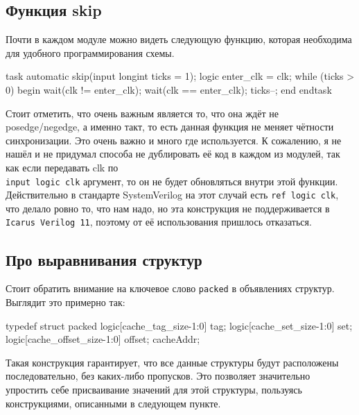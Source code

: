 \documentclass[14pt, russian, onesize]{extreport}
\begin{document}
\subsection*{ Функция skip }
Почти в каждом модуле можно видеть следующую функцию, которая
необходима для удобного программирования схемы.
\begin{svcode}
    task automatic skip(input longint ticks = 1);
        logic enter_clk = clk;
        while (ticks > 0) begin
            wait(clk != enter_clk);
            wait(clk == enter_clk);
            ticks--;
        end
    endtask
\end{svcode}
Стоит отметить, что очень важным является то, что она
ждёт не posedge\slash negedge, а именно такт, то есть
данная функция не меняет чётности синхронизации. Это
очень важно и много где используется.
К сожалению, я не нашёл и не придумал способа не дублировать
её код в каждом из модулей, так как если передавать clk по\\
\texttt{input logic clk} аргумент, то он не будет
обновляться внутри этой функции. Действительно в стандарте
SystemVerilog на этот случай есть \texttt{ref logic clk},
что делало ровно то, что нам надо, но эта конструкция не 
поддерживается в \texttt{Icarus Verilog 11}, поэтому от
её использования пришлось отказаться. 

\subsection*{ Про выравнивания структур }
Стоит обратить внимание на ключевое слово \texttt{packed} 
в объявлениях структур. Выглядит это примерно так:
\begin{svcode}
    typedef struct packed { 
        logic[cache_tag_size-1:0] tag;
        logic[cache_set_size-1:0] set;
        logic[cache_offset_size-1:0] offset;
    } cacheAddr;
\end{svcode}

Такая конструкция гарантирует, что все данные структуры будут
расположены последовательно, без каких-либо пропусков. Это позволяет
значительно упростить себе присваивание значений для этой структуры,
пользуясь конструкциями, описанными в следующем пункте.
\end{document}
